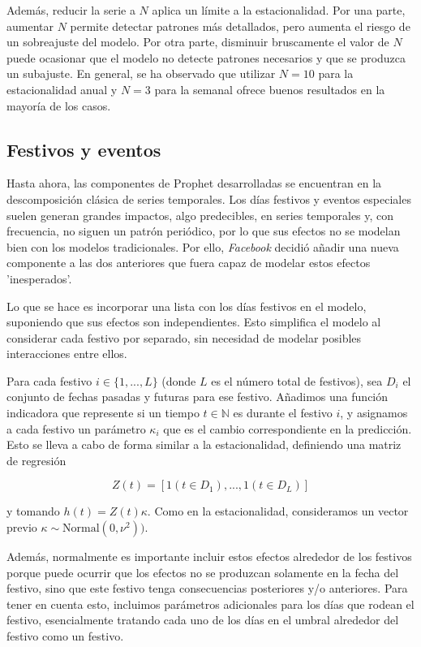 \documentclass[12pt,twoside]{article}
\begin{document}
Además, reducir la serie a $N$ aplica un límite a la estacionalidad. Por una parte, aumentar $N$ permite detectar patrones más detallados, pero aumenta el riesgo de un sobreajuste del modelo. Por otra parte, disminuir bruscamente el valor de $N$ puede ocasionar que el modelo no detecte patrones necesarios y que se produzca un subajuste.
En general, se ha observado que utilizar $N = 10$ para la estacionalidad anual y $N = 3$ para la semanal ofrece buenos resultados en la mayoría de los casos.


\subsection{Festivos y eventos}\label{sec:6}

Hasta ahora, las componentes de Prophet desarrolladas se encuentran en la descomposición clásica de series temporales. Los días festivos y eventos especiales suelen generan grandes impactos, algo predecibles, en series temporales y, con frecuencia, no siguen un patrón periódico, por lo que sus efectos no se modelan bien con los modelos tradicionales. Por ello, \textit{Facebook} decidió añadir una nueva componente a las dos anteriores que fuera capaz de modelar estos efectos 'inesperados'.

Lo que se hace es incorporar una lista con los días festivos en el modelo, suponiendo que sus efectos son independientes. Esto simplifica el modelo al considerar cada festivo por separado, sin necesidad de modelar posibles interacciones entre ellos.

Para cada festivo $i \in \{1,..., L\}$ (donde $L$ es el número total de festivos), sea $D_i$ el conjunto de fechas pasadas y futuras para ese festivo. Añadimos una función indicadora que represente si un tiempo $t \in \mathbb{N}$ es durante el festivo $i$, y asignamos a cada festivo un parámetro $\kappa_i$ que es el cambio correspondiente en la predicción. Esto se lleva a cabo de forma similar a la estacionalidad, definiendo una matriz de regresión 

\begin{equation}
Z(t) = [1(t \in D_1),...,1(t \in D_L)]
\end{equation}

y tomando $h(t) = Z(t) \kappa$. Como en la estacionalidad, consideramos un vector previo $\kappa \sim \text{Normal}(0, \nu^2))$. 

Además, normalmente es importante incluir estos efectos alrededor de los festivos porque puede ocurrir que los efectos no se produzcan solamente en la fecha del festivo, sino que este festivo tenga consecuencias posteriores y/o anteriores. Para tener en cuenta esto, incluimos parámetros adicionales para los días que rodean el festivo, esencialmente tratando cada uno de los días en el umbral alrededor del festivo como un festivo.
\end{document}
